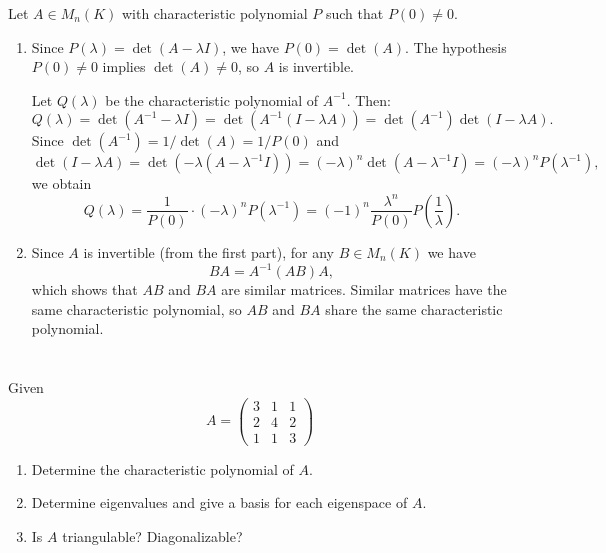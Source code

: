 \documentclass[12pt]{article}
\begin{document}
\begin{correctionbox}
Let $ A \in M_n(K) $ with characteristic polynomial $ P $ such that $ P(0) \neq 0 $.

\begin{enumerate}
    \item Since $ P(\lambda) = \det(A - \lambda I) $, we have $ P(0) = \det(A) $. The hypothesis $ P(0) \neq 0 $ implies $ \det(A) \neq 0 $, so $ A $ is invertible. 
    
    Let $ Q(\lambda) $ be the characteristic polynomial of $ A^{-1} $. Then:
    \[
    Q(\lambda) = \det(A^{-1} - \lambda I) = \det(A^{-1}(I - \lambda A)) = \det(A^{-1})\det(I - \lambda A).
    \]
    Since $ \det(A^{-1}) = 1/\det(A) = 1/P(0) $ and 
    \[
    \det(I - \lambda A) = \det(-\lambda(A - \lambda^{-1}I)) = (-\lambda)^n \det(A - \lambda^{-1}I) = (-\lambda)^n P(\lambda^{-1}),
    \]
    we obtain
    \[
    Q(\lambda) = \frac{1}{P(0)} \cdot (-\lambda)^n P(\lambda^{-1}) = (-1)^n \frac{\lambda^n}{P(0)} P\left(\frac{1}{\lambda}\right).
    \]

    \item Since $ A $ is invertible (from the first part), for any $ B \in M_n(K) $ we have
    \[
    BA = A^{-1}(AB)A,
    \]
    which shows that $ AB $ and $ BA $ are similar matrices. Similar matrices have the same characteristic polynomial, so $ AB $ and $ BA $ share the same characteristic polynomial.
\end{enumerate}
\end{correctionbox}

\section{}
Given 
\[
A = \begin{pmatrix}
3 & 1 & 1 \\
2 & 4 & 2 \\
1 & 1 & 3
\end{pmatrix}
\]

\begin{enumerate}
    \item Determine the characteristic polynomial of \( A \).
    \item Determine eigenvalues and give a basis for each eigenspace of \( A \).
    \item Is \( A \) triangulable? Diagonalizable?
\end{enumerate}
\end{document}
